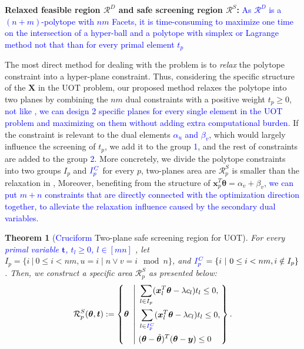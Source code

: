 \documentclass[twoside]{article}
\theoremstyle{plain}
\newtheorem{thm}{Theorem}
\newcommand{\mat}[1]{\mathbf{#1}}
\renewcommand{\vec}[1]{\bm{#1}}
\newcommand{\changeXS}[1]{\textcolor{blue}{#1}}
\begin{document}
{\bf Relaxed feasible region $\mathcal{R}^D$ and safe screening region $\mathcal{R}^S$:} 
\changeXS{As $\mathcal{R}^D$ is a $(n+m)$-polytope with $nm$ Facets, it is time-consuming to maximize one time on the intersection of a hyper-ball and a polytope with simplex or Lagrange method not that than for every primal element $t_p$}

The most direct method for dealing with the problem is to {\it relax} the polytope constraint into a hyper-plane constraint. Thus, considering the specific structure of the $\mat X$ in the UOT problem, our proposed method relaxes the polytope into two planes by combining the $nm$ dual constraints with a positive weight $t_p \geq 0$, \changeXS{not like \citep{7469344}, we can design 2 specific planes for every single element in the UOT problem and maximizing on them without adding extra computational burden.} If the constraint is relevant to the dual elements \changeXS{$\alpha_u$ and $\beta_v$}, which would largely influence the screening of $t_p$, we add it to the group \changeXS{1}, and the rest of constraints are added to the group \changeXS{2}. 
%
More concretely, we divide the polytope constraints into two groups $I_p$ and $\changeXS{{I}^{C}_p}$ for every $p$, two-planes area are $\mathcal{R}^S_{p}$ is smaller than the relaxation in \citep{Yamada_NIPS_2021}, Moreover, benefiting from the structure of $\vec{x}_p^T\vec{\theta} = {\alpha}_{v} + {\beta}_{v}$, \changeXS{we can put $m+n$ constraints that are directly connected with the optimization direction together, to alleviate the relaxation influence caused by the secondary dual variables.}

\begin{thm}[\changeXS{Cruciform} Two-plane safe screening region for UOT]
\label{Thm:AreaScreeningUOT}
For every \changeXS{primal variable $\vec t$, $t_l \geq  0$, $l \in [mn]$ }, let $I_p = \{ i \ | \  0\leq i<nm, u = i\mid n \vee v = i\mod n\}$, and $\changeXS{{I}^{C}_p} = \{ i \ | \  0\leq i<nm, i \notin I_p\}$. Then, we construct a specific area $\mathcal{R}^{S}_{p}$ as presented below:
\changeXS{
\begin{equation}
\label{Eq:FinalRS}
\begin{split} 
\mathcal{R}^S_{p}(\vec{\theta}, \vec{t}):= \left\{\vec{\theta} \ \left|\ 
\begin{aligned}
 &\sum_{l\in I_p}(\vec{x}_{l}^{T}\vec{\theta} - \lambda {c}_l)t_l\leq 0, \\
 &\sum_{l\in \changeXS{{I}^{C}_p}}(\vec{x}_{l} ^{T}\vec{\theta}- \lambda {c}_l)t_l\leq 0, \\
  &(\vec{\theta}-\tilde{\vec{\theta}})^T(\vec{\theta}-\vec{y})\leq 0
\end{aligned}
\right.
\right\}.
\end{split}
\end{equation}
}

\end{thm}
\end{document}
